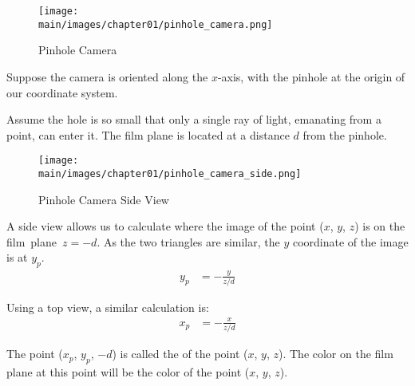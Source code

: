 \documentclass[../COS3712_Notes.tex]{subfiles}
\begin{document}
        \begin{example}
          \begin{wrapfigure}[7]{r}{0.5\textwidth}
            \begin{center}
              \texttt{[image: \\main/images/chapter01/pinhole\_camera.png]}
            \end{center}
            \caption{Pinhole Camera}
          \end{wrapfigure}

          Suppose the camera is oriented along the \mbox{$x$-axis},
          with the pinhole at the origin of our coordinate system.

          Assume the hole is so small that only a single ray of light,
          emanating from a point, can enter it.
          The film plane is located at a distance $d$ from the pinhole.

          \vspace{4.5em}
          \pagebreak

          \begin{wrapfigure}[11]{l}{0.5\textwidth}
            \vspace{-20pt}
            \begin{center}
              \texttt{[image: \\main/images/chapter01/pinhole\_camera\_side.png]}
            \end{center}
            \vspace{-10pt}
            \caption{Pinhole Camera Side View}
          \end{wrapfigure}

          A side view allows us to calculate where the image of the point ($x$, $y$, $z$) is
          on the film~plane~$z = -d$.
          As the two triangles are similar, the $y$ coordinate of the image is at $y_p$.
          \begin{align*}
            y_p &= -\frac{y}{z/d}
          \end{align*}

          Using a top view, a similar calculation is:
          \begin{align*}
            x_p &= -\frac{x}{z/d}
          \end{align*}

          The point ($x_p$, $y_p$, $-d$) is called the 
          of the point ($x$, $y$, $z$).
          The color on the film plane at this point will be the color of the point ($x$, $y$, $z$).
        \end{example}
\end{document}
